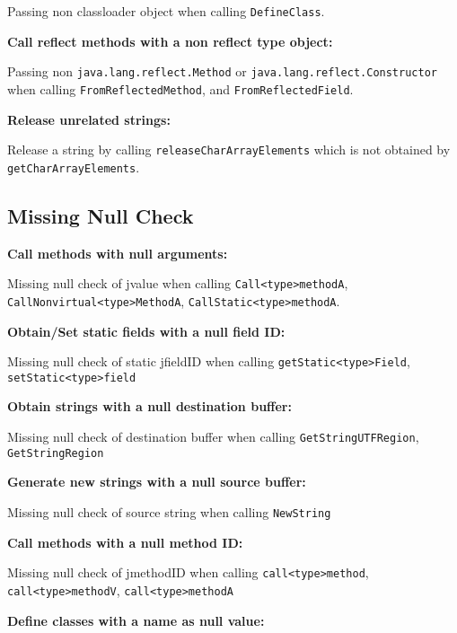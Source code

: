 \documentclass[10pt]{article}
\begin{document}
Passing non classloader object when calling {\tt DefineClass}.

\vspace{3mm}
\noindent \textbf{Call reflect methods with a non reflect type object:}

Passing non {\tt java.lang.reflect.Method} or {\tt java.lang.reflect.Constructor} when calling {\tt FromReflectedMethod}, and {\tt FromReflectedField}.

\vspace{3mm}
\noindent \textbf{Release unrelated strings:}

Release a string by calling {\tt releaseCharArrayElements} which is not obtained by {\tt getCharArrayElements}.

\subsection{Missing Null Check}

\vspace{3mm}
\noindent \textbf{Call methods with null arguments:}

Missing null check of jvalue when calling {\tt Call<type>methodA}, {\tt CallNonvirtual<type>MethodA}, {\tt CallStatic<type>methodA}.

\vspace{3mm}
\noindent \textbf{Obtain/Set static fields with a null field ID:}

Missing null check of static jfieldID when calling {\tt getStatic<type>Field}, {\tt setStatic<type>field}

\vspace{3mm}
\noindent \textbf{Obtain strings with a null destination buffer:}

Missing null check of destination buffer when calling {\tt GetStringUTFRegion}, {\tt GetStringRegion} 

\vspace{3mm}
\noindent \textbf{Generate new strings with a null source buffer:}

Missing null check of source string when calling {\tt NewString}

\vspace{3mm}
\noindent \textbf{Call methods with a null method ID:}

Missing null check of jmethodID when calling {\tt call<type>method}, {\tt call<type>methodV}, {\tt call<type>methodA} 

\vspace{3mm}
\noindent \textbf{Define classes with a name as null value:}
\end{document}
